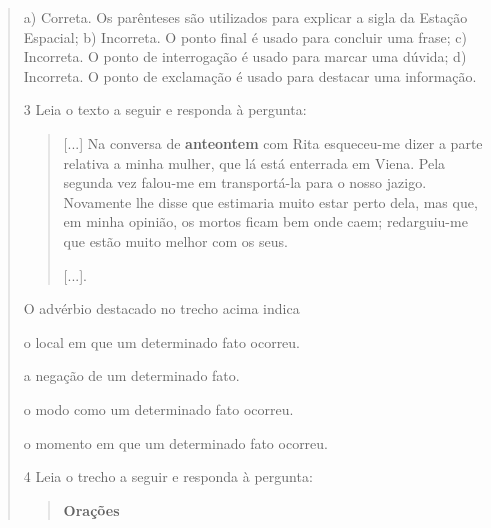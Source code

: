 \begin{quote}
{a) Correta. Os parênteses são utilizados para explicar a sigla da
Estação Espacial;
b) Incorreta. O ponto final é usado para concluir uma frase;
c) Incorreta. O ponto de interrogação é usado para marcar uma dúvida;
d) Incorreta. O ponto de exclamação é usado para destacar uma
informação.}

\num{3} Leia o texto a seguir e responda à pergunta:

\begin{quote}
{[}...{]} Na conversa de \textbf{anteontem} com Rita esqueceu-me dizer
a parte relativa a minha mulher, que lá está enterrada em Viena. Pela
segunda vez falou-me em transportá-la para o nosso jazigo. Novamente lhe
disse que estimaria muito estar perto dela, mas que, em minha opinião,
os mortos ficam bem onde caem; redarguiu-me que estão muito melhor com
os seus.

{[}...{]}.

\end{quote}

O advérbio destacado no trecho acima indica

\begin{escolha}
\item o local em que um determinado fato ocorreu.

\item a negação de um determinado fato.

\item o modo como um determinado fato ocorreu.

\item o momento em que um determinado fato ocorreu.
\end{escolha}


\num{4} Leia o trecho a seguir e responda à pergunta:

\begin{quote}
\textbf{Orações}


\end{quote}
\end{quote}
